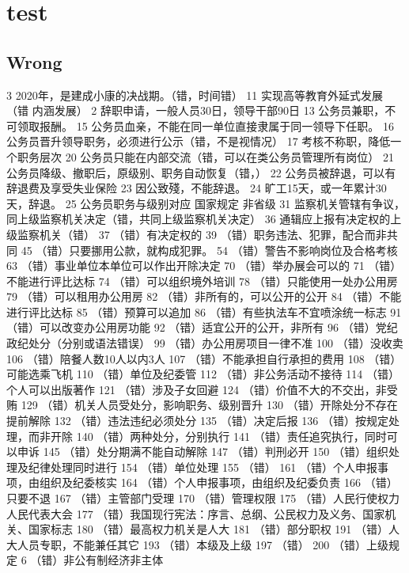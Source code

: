\documentclass[cyan]{elegantnote}
\author{mac}
\date{\today}
\title{}
\begin{document}
\tableofcontents

\chapter{test}
\label{sec:orgc76046a}
\section{Wrong}
\label{sec:org264c2ff}
3 2020年，是建成小康的决战期。（错，时间错）
11 实现高等教育外延式发展 （错 内涵发展）
2 辞职申请，一般人员30日，领导干部90日
13 公务员兼职，不可领取报酬。
15 公务员血亲，不能在同一单位直接隶属于同一领导下任职。
16 公务员晋升领导职务，必须进行公示（错，不是视情况）
17 考核不称职，降低一个职务层次
20 公务员只能在内部交流（错，可以在类公务员管理所有岗位）
21 公务员降级、撤职后，原级别、职务自动恢复（错，）
22 公务员被辞退，可以有辞退费及享受失业保险
23 因公致殘，不能辞退。
24 旷工15天，或一年累计30天，辞退。
25 公务员职务与级别对应 国家规定 非省级
31 监察机关管辖有争议，同上级监察机关决定（错，共同上级监察机关决定）
36 通辑应上报有决定权的上级监察机关（错）
37 （错）有决定权的
39 （错）职务违法、犯罪，配合而非共同
45 （错）只要挪用公款，就构成犯罪。
54 （错）警告不影响岗位及合格考核
63 （错）事业单位本单位可以作出开除决定
70 （错）举办展会可以的
71 （错）不能进行评比达标
74 （错）可以组织境外培训
78 （错）只能使用一处办公用房
79 （错）可以租用办公用房
82 （错）非所有的，可以公开的公开
84 （错）不能进行评比达标
85 （错）预算可以追加
86 （错）有些执法车不宜喷涂统一标志
91（错）可以改变办公用房功能
92 （错）适宜公开的公开，非所有
96 （错）党纪政纪处分（分别或语法错误）
99 （错）办公用房项目一律不准
100 （错）没收卖
106 （错）陪餐人数10人以内3人
107 （错）不能承担自行承担的费用
108 （错）可能选乘飞机
110 （错）单位及纪委管
112 （错）非公务活动不接待
114 （错）个人可以出版著作
121 （错）涉及子女回避
124 （错）价值不大的不交出，非受贿
129 （错）机关人员受处分，影响职务、级别晋升
130 （错）开除处分不存在提前解除
132 （错）违法违纪必须处分
135 （错）决定后报
136 （错）按规定处理，而非开除
140 （错）两种处分，分别执行
141 （错）责任追究执行，同时可以申诉
145 （错）处分期满不能自动解除
147 （错）判刑必开
150 （错）组织处理及纪律处理同时进行
154 （错）单位处理
155 （错）
161 （错）个人申报事项，由组织及纪委核实
164 （错）个人申报事项，由组织及纪委负责
166 （错）只要不退
167 （错）主管部门受理
170 （错）管理权限
175 （错）人民行使权力人民代表大会
177 （错）我国现行宪法：序言、总纲、公民权力及义务、国家机关、国家标志
180 （错）最高权力机关是人大
181 （错）部分职权
191 （错）人大人员专职，不能兼任其它
193 （错）本级及上级
197 （错）
200 （错）上级规定
6 （错）非公有制经济非主体
\end{document}
